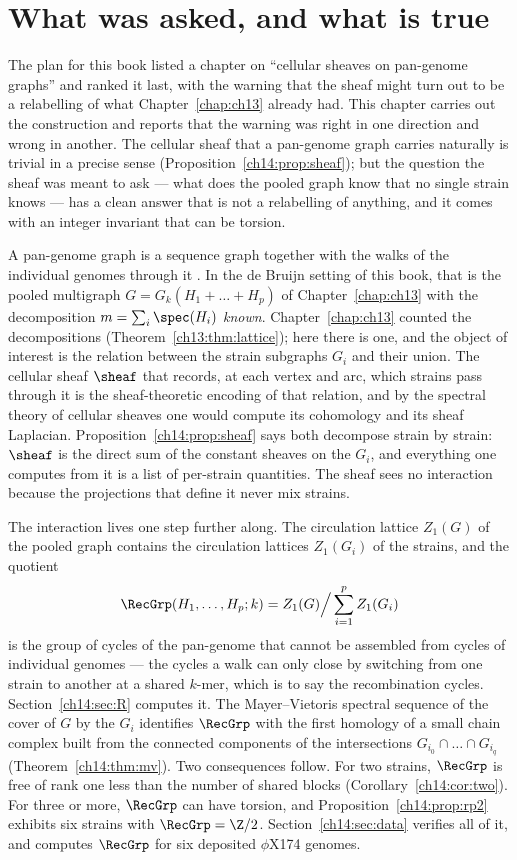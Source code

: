 \section{What was asked, and what is true}

The plan for this book listed a chapter on ``cellular sheaves on pan-genome graphs'' and ranked
it last, with the warning that the sheaf might turn out to be a relabelling of what
Chapter~\ref{chap:ch13} already had. This chapter carries out the construction and reports that the
warning was right in one direction and wrong in another. The cellular sheaf that a pan-genome
graph carries naturally is trivial in a precise sense (Proposition~\ref{ch14:prop:sheaf}); but
the question the sheaf was meant to ask --- what does the pooled graph know that no single
strain knows --- has a clean answer that is not a relabelling of anything, and it comes with
an integer invariant that can be torsion.

A pan-genome graph is a sequence graph together with the walks of the individual genomes
through it \cite{GSN18,EPN20}. In the de Bruijn setting of this book, that is the pooled
multigraph $G=G_k(H_1{+}\dots{+}H_p)$ of Chapter~\ref{chap:ch13} with the decomposition
$m=\sum_i\spec(H_i)$ \emph{known}. Chapter~\ref{chap:ch13} counted the decompositions (Theorem~\ref{ch13:thm:lattice}); here there is
one, and the object of interest is the relation between the strain subgraphs $G_i$ and their
union. The cellular sheaf $\sheaf$ that records, at each vertex and arc, which strains pass
through it is the sheaf-theoretic encoding of that relation, and by the spectral theory of
cellular sheaves \cite{HG19} one would compute its cohomology and its sheaf Laplacian.
Proposition~\ref{ch14:prop:sheaf} says both decompose strain by strain: $\sheaf$ is the direct sum
of the constant sheaves on the $G_i$, and everything one computes from it is a list of
per-strain quantities. The sheaf sees no interaction because the projections that define it
never mix strains.

The interaction lives one step further along. The circulation lattice $Z_1(G)$ of the pooled
graph contains the circulation lattices $Z_1(G_i)$ of the strains, and the quotient
\[
  \RecGrp(H_1,\dots,H_p;k)=Z_1(G)\Big/\sum_{i=1}^pZ_1(G_i)
\]
is the group of cycles of the pan-genome that cannot be assembled from cycles of individual
genomes --- the cycles a walk can only close by switching from one strain to another at a
shared $k$-mer, which is to say the recombination cycles. Section~\ref{ch14:sec:R} computes it.
The Mayer--Vietoris spectral sequence of the cover of $G$ by the $G_i$ identifies $\RecGrp$ with
the first homology of a small chain complex built from the connected components of the
intersections $G_{i_0}\cap\dots\cap G_{i_q}$ (Theorem~\ref{ch14:thm:mv}). Two consequences
follow. For two strains, $\RecGrp$ is free of rank one less than the number of shared blocks
(Corollary~\ref{ch14:cor:two}). For three or more, $\RecGrp$ can have torsion, and
Proposition~\ref{ch14:prop:rp2} exhibits six strains with $\RecGrp=\Z/2$. Section~\ref{ch14:sec:data}
verifies all of it, and computes $\RecGrp$ for six deposited $\phi$X174 genomes.

